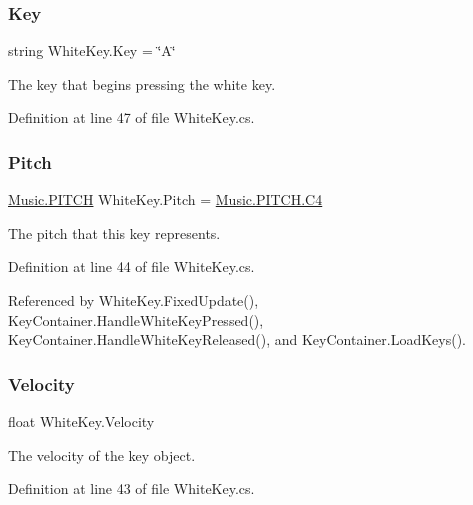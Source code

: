 \subsubsection{\texorpdfstring{Key}{Key}}
{\footnotesize\ttfamily string White\+Key.\+Key = \char`\"{}A\char`\"{}}



The key that begins pressing the white key. 



Definition at line 47 of file White\+Key.\+cs.

\mbox{\label{group___white_key_pub_var_ga1ddd98b85ba069defc7cf47d25f625f4}} 
\subsubsection{\texorpdfstring{Pitch}{Pitch}}
{\footnotesize\ttfamily \hyperlink{group___music_enums_ga508f69b199ea518f935486c990edac1d}{Music.\+P\+I\+T\+CH} White\+Key.\+Pitch = \hyperlink{group___music_enums_gga508f69b199ea518f935486c990edac1dab713e6323a68d3ddabf4855826c50148}{Music.\+P\+I\+T\+C\+H.\+C4}}



The pitch that this key represents. 



Definition at line 44 of file White\+Key.\+cs.



Referenced by White\+Key.\+Fixed\+Update(), Key\+Container.\+Handle\+White\+Key\+Pressed(), Key\+Container.\+Handle\+White\+Key\+Released(), and Key\+Container.\+Load\+Keys().

\mbox{\label{group___white_key_pub_var_gacecf2bff47104955b5dae63840443744}} 
\subsubsection{\texorpdfstring{Velocity}{Velocity}}
{\footnotesize\ttfamily float White\+Key.\+Velocity}



The velocity of the key object. 



Definition at line 43 of file White\+Key.\+cs.

